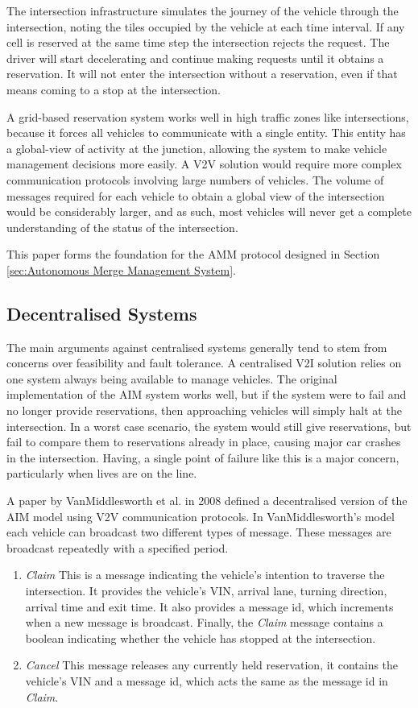 The intersection infrastructure simulates the journey of the vehicle through the intersection, noting the tiles occupied by the vehicle at each time interval. If any cell is reserved at the same time step the intersection rejects the request. The driver will start decelerating and continue making requests until it obtains a reservation. It will not enter the intersection without a reservation, even if that means coming to a stop at the intersection.

A grid-based reservation system works well in high traffic zones like intersections, because it forces all vehicles to communicate with a single entity. This entity has a global-view of activity at the junction, allowing the system to make vehicle management decisions more easily. A V2V solution would require more complex communication protocols involving large numbers of vehicles. The volume of messages required for each vehicle to obtain a global view of the intersection would be considerably larger, and as such, most vehicles will never get a complete understanding of the status of the intersection.

This paper forms the foundation for the AMM protocol designed in Section \ref{sec:Autonomous Merge Management System}.

\FloatBarrier
\subsection{Decentralised Systems}
\label{subsec:Decentralised Systems}
The main arguments against centralised systems generally tend to stem from concerns over feasibility and fault tolerance. A centralised V2I solution relies on one system always being available to manage vehicles. The original implementation of the AIM system works well, but if the system were to fail and no longer provide reservations, then approaching vehicles will simply halt at the intersection. In a worst case scenario, the system would still give reservations, but fail to compare them to reservations already in place, causing major car crashes in the intersection. Having, a single point of failure like this is a major concern, particularly when lives are on the line.

A paper by VanMiddlesworth et al. in 2008 \citep{VanMiddlesworth2008} defined a decentralised version of the AIM model using V2V communication protocols. In VanMiddlesworth's model each vehicle can broadcast two different types of message. These messages are broadcast repeatedly with a specified period.
\begin{enumerate}
\item \emph{Claim}
This is a message indicating the vehicle's intention to traverse the intersection. It provides the vehicle's VIN, arrival lane, turning direction, arrival time and exit time. It also provides a message id, which increments when a new message is broadcast. Finally, the \emph{Claim} message contains a boolean indicating whether the vehicle has stopped at the intersection.
\item \emph{Cancel}
This message releases any currently held reservation, it contains the vehicle's VIN and a message id, which acts the same as the message id in \emph{Claim}.
\end{enumerate}

